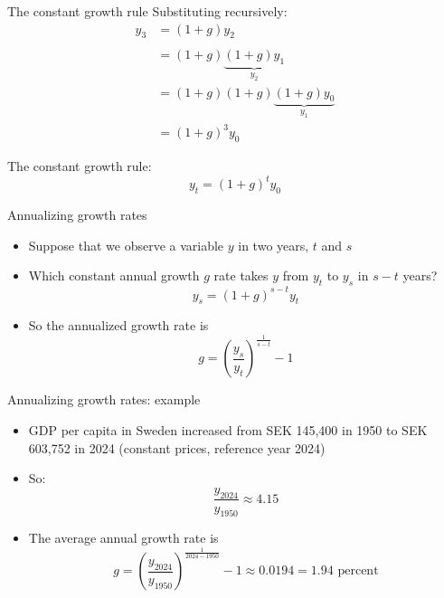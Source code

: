 \documentclass[10pt]{beamer}
\begin{document}
\begin{frame}{The constant growth rule}
Substituting recursively:
\begin{align*}
y_3 &=(1+g)y_2\\ \\
	&=(1+g)\underbrace{(1+g)y_1}_{y_2}\\
	&=(1+g)(1+g)\underbrace{(1+g)y_0}_{y_1}\\
	&=(1+g)^3 y_0
\end{align*}

The constant growth rule:
\begin{equation*} 
y_t = (1+g)^t y_0
\end{equation*}
\end{frame}


\begin{frame}{Annualizing growth rates}
\begin{itemize}
    \item Suppose that we observe a variable $y$ in two years, $t$ and $s$

    \item Which constant annual growth $g$ rate takes $y$ from $y_t$ to $y_s$ in $s-t$ years?
        \[
            y_s = (1+g)^{s-t} y_t
        \]

    \item So the annualized growth rate is
        \[
            g = \left( \frac{y_s}{y_t} \right) ^\frac{1}{s-t} - 1
        \]
\end{itemize}
\end{frame}


\begin{frame}{Annualizing growth rates: example}
\begin{itemize}
    \item GDP per capita in Sweden increased from SEK 145,400 in 1950 to SEK 603,752 in 2024 {\footnotesize(constant prices, reference year 2024)} \medskip

    \item So:
        \[
            \frac{y_{2024}}{y_{1950}} \approx 4.15
        \] \medskip

    \item The average annual growth rate is
        \[
            g = \left( \frac{y_{2024}}{y_{1950}} \right) ^\frac{1}{2024-1950} - 1 \approx 0.0194 = 1.94 \text{ percent}
        \]
\end{itemize}
\end{frame}
\end{document}
